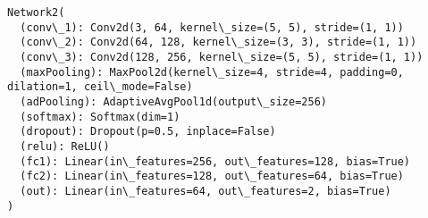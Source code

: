 \documentclass[11pt]{article}
\begin{document}
    \begin{Verbatim}[commandchars=\\\{\}]
Network2(
  (conv\_1): Conv2d(3, 64, kernel\_size=(5, 5), stride=(1, 1))
  (conv\_2): Conv2d(64, 128, kernel\_size=(3, 3), stride=(1, 1))
  (conv\_3): Conv2d(128, 256, kernel\_size=(5, 5), stride=(1, 1))
  (maxPooling): MaxPool2d(kernel\_size=4, stride=4, padding=0, dilation=1, ceil\_mode=False)
  (adPooling): AdaptiveAvgPool1d(output\_size=256)
  (softmax): Softmax(dim=1)
  (dropout): Dropout(p=0.5, inplace=False)
  (relu): ReLU()
  (fc1): Linear(in\_features=256, out\_features=128, bias=True)
  (fc2): Linear(in\_features=128, out\_features=64, bias=True)
  (out): Linear(in\_features=64, out\_features=2, bias=True)
)

    \end{Verbatim}
\end{document}
